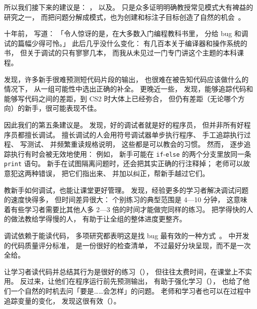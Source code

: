 所以我们接下来的建议是：
，
以及。
\cite{Mull2007b}只是众多证明明确教授常见模式大有裨益的研究之一，
而把问题分解成模式，也为创建和标注子目标创造了自然的机会~\cite{Marg2012,Marg2016}。


十年前，
\cite{McCa2008}写道：
「令人惊讶的是，在大多数入门编程教科书里，
分给 bug 和调试的篇幅少得可怜。」
此后几乎没什么变化：
有几百本关于编译器和操作系统的书，
但关于调试的只有寥寥几本，
而我从未见过一门专门讲这个主题的本科课程。

\cite{List2004,List2009}发现，许多新手很难预测短代码片段的输出，
也很难在被告知代码应该做什么的情况下，
从一组可能性中选出正确的补全。
更晚近一些，
\cite{Harr2018}发现，能够追踪代码和能够写代码之间的差距，到 CS2 时大体上已经弥合，
但仍有差距（无论哪个方向）的新手，很可能表现不佳。

因此我们的第五条建议是。
\cite{Fitz2008,Murp2008}发现，好的调试者就是好的程序员，
但并非所有好程序员都擅长调试。
擅长调试的人会用符号调试器单步执行程序、
手工追踪执行过程、
写测试、
并频繁重读规格说明，
这些都是可以教会的习惯。
然而，
逐步追踪执行有时会被无效地使用：
例如，
新手可能在 \texttt{if}-\texttt{else} 的两个分支里放同一条 \texttt{print} 语句。
新手在试图隔离问题时，还会把其实正确的行注释掉；
老师可以故意犯这两种错误，
把它们指出来、
并加以纠正，帮新手越过它们。

教新手如何调试，也能让课堂更好管理。
\cite{Alqa2017}发现，经验更多的学习者解决调试问题的速度快得多，
但时间差异很大：
个别练习的典型范围是 4—10 分钟，
这意味着有些学习者需要比其他人多 2—3 倍的时间才能做完同样的练习。
把学得快的人的做法教给学得慢的人，
有助于让全组的整体进度更整齐。

调试依赖于能读代码，
多项研究都表明这是找 bug 最有效的一种方式~\cite{Basi1987,Keme2009,Bacc2013}。
\cite{Steg2014,Steg2016a}中开发的代码质量评分标准，
是一份很好的检查清单，
不过最好分块呈现，而不是一次全给。

让学习者读代码并总结其行为是很好的练习（），
但往往太费时间，在课堂上不实用。
反过来，让他们在程序运行前先预测输出，
有助于强化学习（），
也给了他们一个自然的时机去问「要是……会怎样」的问题。
老师和学习者也可以在过程中追踪变量的变化，
\cite{Cunn2017}发现这很有效（）。


